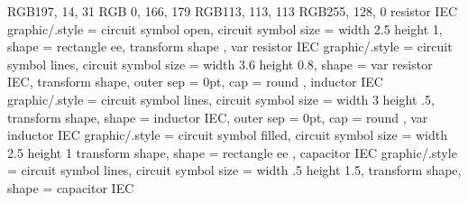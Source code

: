 %
%
%
%
%
\usepackage[headsepline, footsepline]{scrlayer-scrpage}
\pagestyle{scrheadings}
%
\ihead[]{%

}
\chead[]{\courseshort\ \semestershort\\\eventtype\ \eventnumber}
\ofoot[]{}
%
%
%
\renewcommand*\thesubsection{\arabic{section}.\arabic{subsection}}
\renewcommand*\thefigure{\arabic{section}.\arabic{figure}}
\renewcommand*\thetable{\arabic{section}.\arabic{table}}
%
%
%
%
%
%
\DeclareMathOperator{\arsinh}{arsinh}
\DeclareMathOperator{\arcosh}{arcosh}
\newcommand{\diff}{\ensuremath{\mathrm{d}}}
%
%
%
\definecolor{turot}  {RGB}{197,  14,  31}
\definecolor{tublau} {RGB}{  0, 166, 179}
\definecolor{tugrau} {RGB}{113, 113, 113}
\definecolor{tugelb} {RGB}{255, 128,   0}
%
%
%
\tikzset
{
  resistor IEC graphic/.style =
  {
    circuit symbol open,
    circuit symbol size = width 2.5 height 1,
    shape = rectangle ee,
    transform shape
  },
  var resistor IEC graphic/.style =
  {
    circuit symbol lines,
    circuit symbol size = width 3.6 height 0.8,
    shape = var resistor IEC,
    transform shape,
    outer sep = 0pt,
    cap = round
  },
  inductor IEC graphic/.style =
  {
    circuit symbol lines,
    circuit symbol size = width 3 height .5,
    transform shape,
    shape = inductor IEC,
    outer sep = 0pt,
    cap = round
  },
  var inductor IEC graphic/.style =
  {
    circuit symbol filled,
    circuit symbol size = width 2.5 height 1
    transform shape,
    shape = rectangle ee
  },
  capacitor IEC graphic/.style =
  {
    circuit symbol lines,
    circuit symbol size = width .5 height 1.5,
    transform shape,
    shape = capacitor IEC
  }
}
%
%
%
%
%